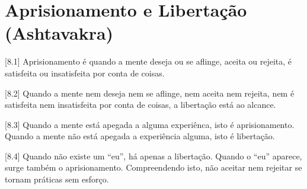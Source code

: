 \chapter[(Ashtavakra)]{Aprisionamento e Libertação (Ashtavakra)}

[8.1] Aprisionamento é quando a mente deseja ou se aflinge, aceita ou rejeita, é satisfeita ou insatisfeita por conta de coisas.

[8.2] Quando a mente nem deseja nem se aflinge, nem aceita nem rejeita, nem é satisfeita nem insatisfeita por conta de coisas, a libertação está ao alcance.

[8.3] Quando a mente está apegada a alguma experiênca, isto é aprisionamento. Quando a mente não está apegada a experiência alguma, isto é libertação.

[8.4] Quando não existe um ``eu'', há apenas a libertação. Quando o ``eu'' aparece, surge também o aprisionamento. Compreendendo isto, não aceitar nem rejeitar se tornam práticas sem esforço.
